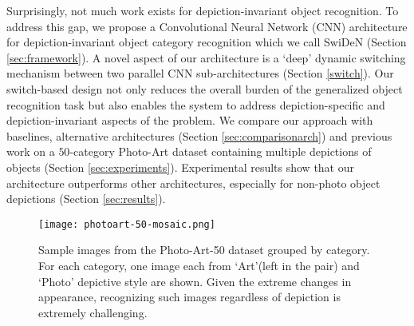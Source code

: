 \documentclass[preprint]{sig-alternate-05-2015}
\begin{document}
Surprisingly, not much work exists for depiction-invariant object recognition. To address this gap, we propose a Convolutional Neural Network (CNN) architecture for depiction-invariant object category recognition which we call SwiDeN (Section \ref{sec:framework}). A novel aspect of our architecture is a `deep' dynamic switching mechanism between two parallel CNN sub-architectures (Section \ref{switch}). Our switch-based design not only reduces the overall burden of the generalized object recognition task but also enables the system to address depiction-specific and depiction-invariant aspects of the problem. We compare our approach with baselines,  alternative architectures (Section \ref{sec:comparisonarch}) and previous work on a $50$-category Photo-Art dataset containing multiple depictions of objects (Section \ref{sec:experiments}). Experimental results show that our architecture outperforms other architectures, especially for non-photo object depictions (Section \ref{sec:results}). 

\begin{figure}[!tbp]
    \centering    
		\texttt{[image: photoart-50-mosaic.png]}
		\caption{Sample images from the Photo-Art-50 dataset grouped by category. For each category, one image each from `Art'(left in the pair) and `Photo' depictive style are shown. Given the extreme changes in appearance, recognizing such images regardless of depiction is extremely challenging.} 
		\label{fig:datasetpic}    
\end{figure}

\begin{figure*}[ht]
	\mbox{}\hspace{0.3cm}\mbox{}\hspace{0.3cm}\mbox{}\hspace{0.3cm}\caption{Our proposed architecture SwiDeN is shown in \ref{fig:3imgs}(c). The depictive style of the  cartoon-ish horse image is  determined as `Art' by  \textsc{Switch} (purple block). An associated switch layer relays it to the `Art' sub-network (green block). The latter's output is passed via a series of shared layers and finally, a softmax classifier generates the label \texttt{Horse}. Figure  \ref{fig:3imgs}(a) is the baseline architecture. Figure \ref{fig:3imgs}(b) (GRN) is a modification of architecture proposed by Ganin et al~\cite{ganin2015unsupervised}. VGG-19~\cite{Simonyan14c} is used as the base network for all architectures.}
\label{fig:3imgs}
\end{figure*}
\end{document}
